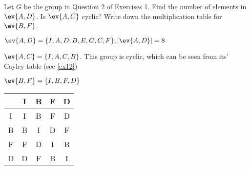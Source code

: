 \begin{exercise}
    Let \(G\) be the group in Question 2 of Exercises 1. Find the number of elements in \(\ev{A, D}\). Is \(\ev{A, C}\) cyclic? Write down the multiplication table for \(\ev{B, F}\).
\end{exercise}
\begin{solution}
    \(\ev{A, D} = \{I, A, D, B, E, G, C, F\}, |\ev{A, D}| = 8\)

    \(\ev{A, C} = \{I, A, C, B\}\). This group is cyclic, which can be seen from its' Cayley table (see \ref{ex12})

    \(\ev{B, F} = \{I, B, F, D\}\)
    \begin{center}
        \begin{tabular}{C|C|C|C|C}
              & I & B & F & D \\ \hline
            I & I & B & F & D \\
            B & B & I & D & F \\
            F & F & D & I & B \\
            D & D & F & B & I \\
        \end{tabular}
    \end{center}
\end{solution}

